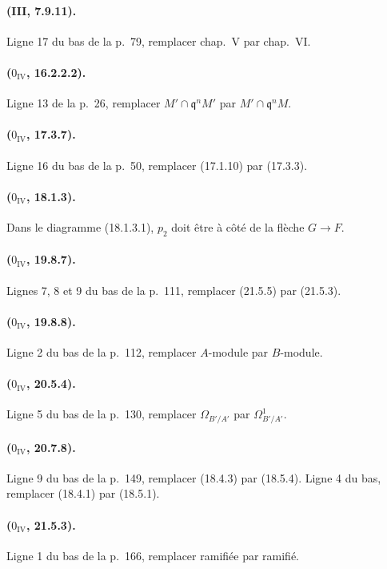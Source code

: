 \paragraph{(III, 7.9.11).}
Ligne 17 du bas de la p.~79, remplacer chap.~V par chap.~VI.

\paragraph{($0_{\mathrm{IV}}$, 16.2.2.2).}
Ligne 13 de la p.~26, remplacer $M'\cap\mathfrak q^nM'$ par
$M'\cap\mathfrak q^nM$.

\paragraph{($0_{\mathrm{IV}}$, 17.3.7).}
Ligne 16 du bas de la p.~50, remplacer (17.1.10) par (17.3.3).

\paragraph{($0_{\mathrm{IV}}$, 18.1.3).}
Dans le diagramme (18.1.3.1), $p_2$ doit être à côté de la flèche
$G\to F$.

\paragraph{($0_{\mathrm{IV}}$, 19.8.7).}
Lignes 7, 8 et 9 du bas de la p.~111, remplacer (21.5.5) par (21.5.3).

\paragraph{($0_{\mathrm{IV}}$, 19.8.8).}
Ligne 2 du bas de la p.~112, remplacer $A$-module par $B$-module.

\paragraph{($0_{\mathrm{IV}}$, 20.5.4).}
Ligne 5 du bas de la p.~130, remplacer $\Omega_{B'/A'}$ par
$\Omega^1_{B'/A'}$.

\paragraph{($0_{\mathrm{IV}}$, 20.7.8).}
Ligne 9 du bas de la p.~149, remplacer (18.4.3) par (18.5.4). Ligne 4
du bas, remplacer (18.4.1) par (18.5.1).

\paragraph{($0_{\mathrm{IV}}$, 21.5.3).}
Ligne 1 du bas de la p.~166, remplacer ramifiée par ramifié.

